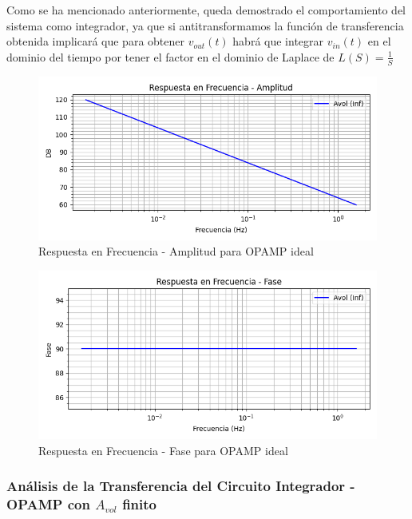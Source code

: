 Como se ha mencionado anteriormente, queda demostrado el comportamiento del sistema como integrador, ya que si antitransformamos la función de transferencia
obtenida implicará que para obtener $v_{out}(t)$ habrá que integrar $v_{in}(t)$ en el dominio del tiempo por tener el factor en el dominio de Laplace de $L(S)=\frac{1}{S}$

\begin{figure}[H]
    \centering 
    \includegraphics [scale=1] {../Ejercicio3-CircuitoIntegradoresyDerivadores/Imagenes/teorico-avol-inf-integrador-amplitud.png} 
    \caption{Respuesta en Frecuencia - Amplitud para OPAMP ideal}
    \label{fig:emptyPlotTool}
\end{figure}

\begin{figure}[H]
    \centering 
    \includegraphics [scale=1] {../Ejercicio3-CircuitoIntegradoresyDerivadores/Imagenes/teorico-avol-inf-integrador-fase.png} 
    \caption{Respuesta en Frecuencia - Fase para OPAMP ideal}
    \label{fig:emptyPlotTool}
\end{figure}

\subsubsection{Análisis de la Transferencia del Circuito Integrador - OPAMP con $A_{vol}$ finito}

